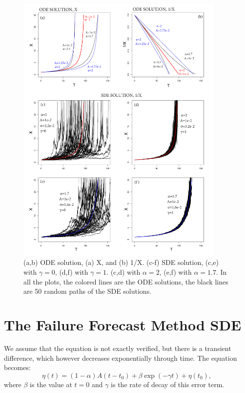 \documentclass{article}
\begin{document}
\begin{figure}[H]
\centering
\includegraphics[width=0.92\textwidth]{Fig1_plus.png}
\caption{(a,b) ODE solution, (a) X, and (b) 1/X. (c-f) SDE solution, (c,e) with $\gamma=0$, (d,f) with $\gamma=1$. (c,d) with $\alpha=2$, (e,f) with $\alpha=1.7$. In all the plots, the colored lines are the ODE solutions, the black lines are 50 random paths of the SDE solutions.}
\label{Fig1}
\end{figure}

\section{The Failure Forecast Method SDE}
We assume that the equation is not exactly verified, but there is a transient difference, which however decreases exponentially through time. The equation becomes:
$$\eta(t)=(1-\alpha)A(t-t_0) +\beta\exp(-\gamma t)+\eta(t_0),$$
where $\beta$ is the value at $t=0$ and $\gamma$ is the rate of decay of this error term.
\end{document}
